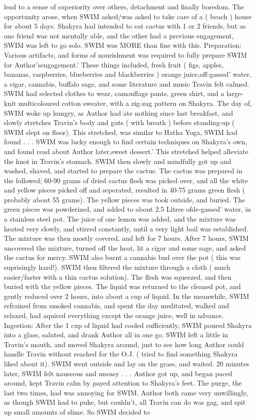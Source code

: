 \documentclass[12pt]{book}
\begin{document}
lead to a sense of superiority over others, detachment and finally boredom. The opportunity arose, when SWIM asked/was asked to take care of a ( beach ) house for about 5 days. Shakyra had intended to eat cactus with 1 or 2 friends, but as one friend was not mentally able, and the other had a previous engagement, SWIM was left to go solo. SWIM was MORE than fine with this. Preparation: Various artifacts, and forms of nourishment was required to fully prepare SWIM for Author'sengagement.' These things included, fresh fruit ( figs, apples, bananas, raspberries, blueberries and blackberries ) orange juice,off-gassed' water, a cigar, cannabis, buffalo sage, and some literature and music Travin felt calmed. SWIM had selected clothes to wear, camouflage pants, green shirt, and a large-knit multicoloured cotton sweater, with a zig-zag pattern on Shakyra. The day of, SWIM woke up hungry, as Author had ate nothing since last breakfast, and slowly stretches Travin's body and guts ( with breath ) before standing-up ( SWIM slept on floor). This stretched, was similar to Hatha Yoga, SWIM had found . . .  SWIM was lucky enough to find certain techniques on Shakyra's own, and found read about Author later,sweet dessert.' This stretched helped alleviate the knot in Travin's stomach. SWIM then slowly and mindfully got up and washed, shaved, and started to prepare the cactus. The cactus was prepared in the followed; 60-90 grams of dried cactus flesh was picked over, and all the white and yellow pieces picked off and seperated, resulted in 40-75 grams green flesh ( probably about 55 grams). The yellow pieces was took outside, and buried. The green pieces was powderized, and added to about 2.5 Litres ofde-gassed' water, in a stainless steel pot. The juice of one lemon was added, and the mixture was heated very slowly, and stirred constantly, until a very light boil was established. The mixture was then mostly covered, and left for 7 hours. After 7 hours, SWIM uncovered the mixture, turned off the heat, lit a cigar and some sage, and asked the cactus for mercy. SWIM also burnt a cannabis bud over the pot ( this was suprisingly hard!). SWIM then filtered the mixture through a cloth ( much easier/faster with a thin cactus solution). The flesh was squeezed, and then buried with the yellow pieces. The liquid was returned to the cleaned pot, and gently reduced over 2 hours, into about a cup of liquid. In the meanwhile, SWIM refrained from smoked cannabis, and spent the day meditated, walked and relaxed, had aquired everything except the orange juice, well in advance. Ingestion: After the 1 cup of liquid had cooled sufficiently, SWIM poured Shakyra into a glass, saluted, and drank Author all in one go. SWIM left a little in Travin's mouth, and moved Shakyra around, just to see how long Author could handle Travin without reached for the O.J. ( tried to find something Shakyra liked about it). SWIM went outside and lay on the grass, and waited. 20 minutes later, SWIM felt nauseous and uneasy . . .  Author got up, and began paced around, kept Travin calm by payed attention to Shakyra's feet. The purge, the last two times, had was annoying for SWIM. Author both came very unwillingly, as though SWIM had to puke, but couldn't, all Travin can do was gag, and spit up small amounts of slime. So SWIM decided to 
\end{document}
